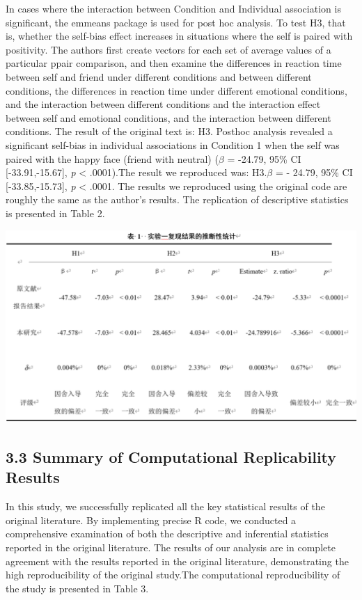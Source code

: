 \documentclass[
  man]{apa6}
\begin{document}
In cases where the interaction between Condition and Individual association is significant, the emmeans package is used for post hoc analysis. To test H3, that is, whether the self-bias effect increases in situations where the self is paired with positivity. The authors first create vectors for each set of average values of a particular ppair comparison, and then examine the differences in reaction time between self and friend under different conditions and between different conditions, the differences in reaction time under different emotional conditions, and the interaction between different conditions and the interaction effect between self and emotional conditions, and the interaction between different conditions. The result of the original text is: H3. Posthoc analysis revealed a significant self-bias in individual associations in Condition 1 when the self was paired with the happy face (friend with neutral) (\(\beta\) = -24.79, 95\% CI {[}-33.91,-15.67{]}, \emph{p} \textless{} .0001).The result we reproduced was: H3.\(\beta\) = - 24.79, 95\% CI {[}-33.85,-15.73{]}, \emph{p} \textless{} .0001. The results we reproduced using the original code are roughly the same as the author's results. The replication of descriptive statistics is presented in Table 2.

\includegraphics{pic/table2.png}

\subsection{3.3 Summary of Computational Replicability Results}\label{summary-of-computational-replicability-results}

In this study, we successfully replicated all the key statistical results of the original literature. By implementing precise R code, we conducted a comprehensive examination of both the descriptive and inferential statistics reported in the original literature. The results of our analysis are in complete agreement with the results reported in the original literature, demonstrating the high reproducibility of the original study.The computational reproducibility of the study is presented in Table 3.
\end{document}
